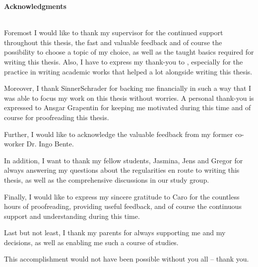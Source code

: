 \thispagestyle{empty}\thispagestyle{noheader}
\begin{large}
	\textbf{Acknowledgments} \\ \\
\end{large}

Foremost I would like to thank my supervisor \firstTutor for the continued support throughout this thesis, the fast and valuable feedback and of course the possibility to choose a topic of my choice, as well as the taught basics required for writing this thesis. Also, I have to express my thank-you to \secondTutor, especially for the practice in writing academic works that helped a lot alongside writing this thesis.

Moreover, I thank SinnerSchrader for backing me financially in such a way that I was able to focus my work on this thesis without worries. A personal thank-you is expressed to Ansgar Grapentin for keeping me motivated during this time and of course for proofreading this thesis.

Further, I would like to acknowledge the valuable feedback from my former co-worker Dr. Ingo Bente.

In addition, I want to thank my fellow students, Jasmina, Jens and Gregor for always answering my questions about the regularities en route to writing this thesis, as well as the comprehensive discussions in our study group.

Finally, I would like to express my sincere gratitude to Caro for the countless hours of proofreading, providing useful feedback, and of course the continuous support and understanding during this time.

Last but not least, I thank my parents for always supporting me and my decisions, as well as enabling me such a course of studies.

This accomplishment would not have been possible without you all -- thank you.

\newpage
